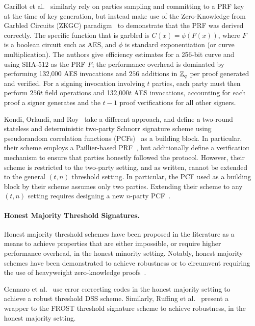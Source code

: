 Garillot et al.~\cite{GarillotKMN21} similarly rely on parties sampling and committing to a PRF key at the time of key generation,
but instead make use of the Zero-Knowledge from Garbled Circuits (ZKGC) paradigm~\cite{JawurekKO13} to demonstrate that the PRF was derived correctly.
The specific function that is garbled is $C(x) = \phi(F(x))$,
where $F$ is a boolean circuit such as AES,
and $\phi$ is standard exponentiation (or curve multiplication).
The authors give efficiency estimates for a 256-bit curve  and using SHA-512 as
the PRF $F$;
the performance overhead is dominated by performing 132,000 AES invocations and $256$ additions in $\mathbb{Z}_q$ per proof generated and verified.
For a signing invocation involving $t$ parties,
each party must then perform $256t$ field operations and 132,000$t$ AES invocations,
accounting for each proof a signer generates and the $t-1$ proof verifications for all other signers.

Kondi, Orlandi, and Roy~\cite{KondiOR23} take a different approach,
and define a two-round stateless and deterministic two-party Schnorr signature scheme using pseudorandom correlation functions (PCFs)~\cite{BoyleCGIKS20} as a building block.
In particular,
their scheme employs a Paillier-based PRF~\cite{OrlandiSY21},
but additionally define a verification mechanism to ensure that parties honestly followed the protocol.
However,
their scheme is restricted to the two-party setting,
and as written, cannot be extended to the general $(t,n)$ threshold setting.
In particular, the PCF used as a building block by their scheme assumes only two parties.
Extending their scheme to any $(t,n)$ setting requires designing a new $n$-party PCF~\cite{KPC24}.

\paragraph{Honest Majority Threshold Signatures.}
Honest majority threshold schemes have been proposed in the literature as a means to achieve properties that are either impossible,
or require higher performance overhead,
in the honest minority setting.
Notably, honest majority schemes have been demonstrated to achieve robustness or to circumvent requiring the use of heavyweight zero-knowledge proofs~\cite{CanettiGGMP20}.

Gennaro et al.~\cite{GennaroJKR96} use error correcting codes in the honest majority setting to achieve a robust threshold DSS scheme.
Similarly, Ruffing et al.~\cite{RuffingRJSS22} present a wrapper to the FROST threshold signature scheme to achieve robustness,
in the honest majority setting.

